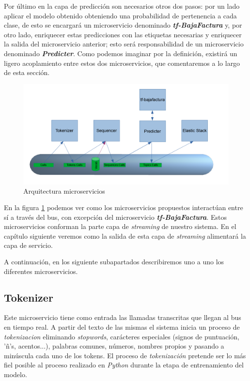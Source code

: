 Por último en la capa de predicción son necesarios otros dos pasos: por un lado aplicar el modelo obtenido obteniendo una probabilidad de pertenencia a cada clase, de esto se encargará un microservicio denominado \textbf{\textit{tf-BajaFactura}} y, por otro lado, enriquecer estas predicciones con las etiquetas necesarias y enriquecer la salida del microservicio anterior; esto será responsabilidad de un microservicio denominado \textbf{\textit{Predicter}}. Como podemos imaginar por la definición, existirá un ligero acoplamiento entre estos dos microservicios, que comentaremos a lo largo de esta sección.


\begin{figure}[!ht]
	\centering
	\includegraphics[width=1\textwidth]{images/exp/micro-arch}
	\caption{Arquitectura microservicios}
	\label{fig:micro-arch}
\end{figure}


En la figura \ref{fig:micro-arch} podemos ver como los microservicios propuestos interactúan entre sí a través del bus, con excepción del microservicio  \textbf{\textit{tf-BajaFactura}}. Estos microservicios conforman la parte capa de \textit{streaming} de nuestro sistema. En el capítulo siguiente veremos como la salida de esta capa de \textit{streaming} alimentará la capa de servicio.


A continuación, en los siguiente subapartados describiremos uno a uno los diferentes microservicios. 


\subsection{Tokenizer}

Este microservicio tiene como entrada las llamadas transcritas que llegan al bus en tiempo real. A partir del texto de las mismas el sistema inicia un proceso de \textit{tokenizacion} eliminando \textit{stopwords}, carácteres especiales (signos de puntuación, 'ñ's, acentos...), palabras comunes, números, nombres propios y pasando a minúscula cada uno de los tokens.  El proceso de \textit{tokenización} pretende ser lo más fiel posible al proceso realizado en \textit{Python} durante la etapa de entrenamiento del modelo.

